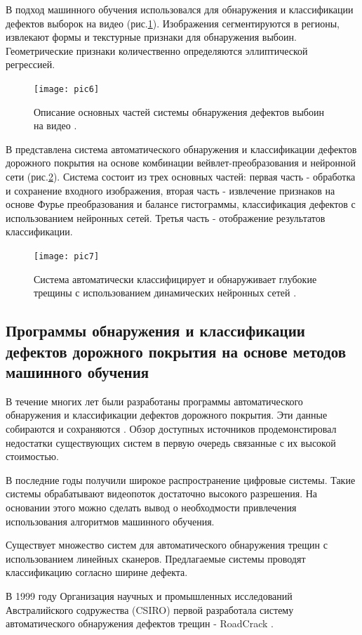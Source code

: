 \documentclass[a4paper,14pt]{extreport}
\begin{document}
В \cite{h110} подход машинного обучения использовался для обнаружения и классификации дефектов выборок на видео (рис.\ref{pic6}). Изображения сегментируются в регионы, извлекают формы и текстурные признаки для обнаружения выбоин. Геометрические признаки количественно определяются эллиптической регрессией.
\begin{figure}[ht!]
\centering
\texttt{[image: pic6]}
\caption{Описание основных частей системы обнаружения дефектов выбоин на видео \cite{h110}.}
	\label{pic6}
	\end{figure}

В \cite{h104} представлена система автоматического обнаружения и классификации дефектов дорожного покрытия на основе комбинации вейвлет-преобразования и нейронной сети (рис.\ref{pic7}). Система состоит из трех основных частей: первая часть - обработка и сохранение входного изображения, вторая часть - извлечение признаков на основе Фурье преобразования и балансе гистограммы, классификация дефектов с использованием нейронных сетей. Третья часть - отображение результатов классификации.
\begin{figure}[ht!]
\centering
\texttt{[image: pic7]}
\caption{Система автоматически классифицирует и обнаруживает глубокие трещины с использованием динамических нейронных сетей \cite{h104}.}
	\label{pic7}
	\end{figure}
\subsection{Программы обнаружения и классификации дефектов дорожного покрытия на основе методов машинного обучения}
В течение многих лет были разработаны программы автоматического обнаружения и классификации дефектов дорожного покрытия. Эти данные собираются и сохраняются \cite{h95, h96}. Обзор доступных источников продемонстировал недостатки существующих систем в первую очередь связанные с их высокой стоимостью.

В последние годы получили широкое распространение цифровые системы. Такие системы обрабатывают видеопоток достаточно высокого разрешения. На основании этого можно сделать вывод о необходмости привлечения использования алгоритмов машинного обучения.

Существует множество систем для автоматического обнаружения трещин с использованием линейных сканеров. Предлагаемые системы проводят классификацию согласно ширине дефекта.

В 1999 году Организация научных и промышленных исследований Австралийского содружества (CSIRO) первой разработала систему автоматического обнаружения дефектов трещин - RoadCrack \cite{h18}. 
\end{document}
